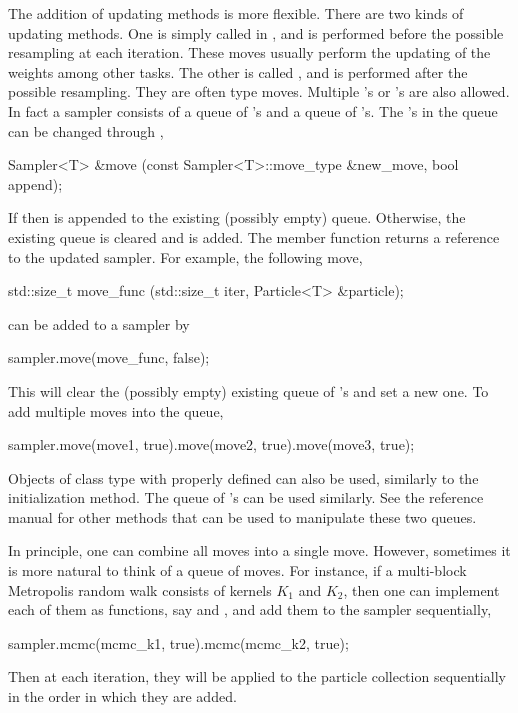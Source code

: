 The addition of updating methods is more flexible. There are two kinds of
updating methods. One is simply called  in \vsmc, and is performed
before the possible resampling at each iteration. These moves usually perform
the updating of the weights among other tasks. The other is called
, and is performed after the possible resampling. They are often
\mcmc type moves. Multiple 's or 's are also allowed. In
fact a \vsmc sampler consists of a queue of 's and a queue of
's. The 's in the queue can be changed through
,
\begin{cppcode}
Sampler<T> &move (const Sampler<T>::move_type &new_move, bool append);
\end{cppcode}
If  then  is appended to the existing
(possibly empty) queue. Otherwise, the existing queue is cleared and
 is added. The member function returns a reference to the
updated sampler. For example, the following move,
\begin{cppcode}
std::size_t move_func (std::size_t iter, Particle<T> &particle);
\end{cppcode}
can be added to a sampler by
\begin{cppcode}
sampler.move(move_func, false);
\end{cppcode}
This will clear the (possibly empty) existing queue of 's and set a
new one. To add multiple moves into the queue,
\begin{cppcode}
sampler.move(move1, true).move(move2, true).move(move3, true);
\end{cppcode}
Objects of class type with  properly defined can also be
used, similarly to the initialization method. The queue of 's can
be used similarly. See the reference manual for other methods that can be used
to manipulate these two queues.

In principle, one can combine all moves into a single move. However, sometimes
it is more natural to think of a queue of moves. For instance, if a
multi-block Metropolis random walk consists of kernels $K_1$ and $K_2$, then
one can implement each of them as functions, say  and
, and add them to the sampler sequentially,
\begin{cppcode}
sampler.mcmc(mcmc_k1, true).mcmc(mcmc_k2, true);
\end{cppcode}
Then at each iteration, they will be applied to the particle collection
sequentially in the order in which they are added.


